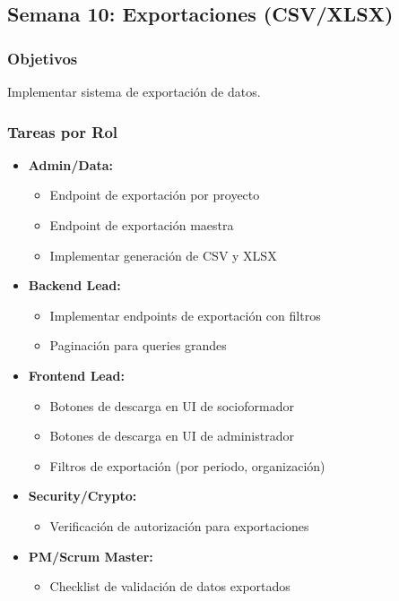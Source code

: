\documentclass[12pt,a4paper]{article}
\begin{document}
\subsection{Semana 10: Exportaciones (CSV/XLSX)}

\subsubsection{Objetivos}
Implementar sistema de exportación de datos.

\subsubsection{Tareas por Rol}

\begin{itemize}[leftmargin=*]
    \item \textbf{Admin/Data:}
    \begin{itemize}
        \item Endpoint de exportación por proyecto
        \item Endpoint de exportación maestra
        \item Implementar generación de CSV y XLSX
    \end{itemize}
    
    \item \textbf{Backend Lead:}
    \begin{itemize}
        \item Implementar endpoints de exportación con filtros
        \item Paginación para queries grandes
    \end{itemize}
    
    \item \textbf{Frontend Lead:}
    \begin{itemize}
        \item Botones de descarga en UI de socioformador
        \item Botones de descarga en UI de administrador
        \item Filtros de exportación (por periodo, organización)
    \end{itemize}
    
    \item \textbf{Security/Crypto:}
    \begin{itemize}
        \item Verificación de autorización para exportaciones
    \end{itemize}
    
    \item \textbf{PM/Scrum Master:}
    \begin{itemize}
        \item Checklist de validación de datos exportados
    \end{itemize}
\end{itemize}
\end{document}
